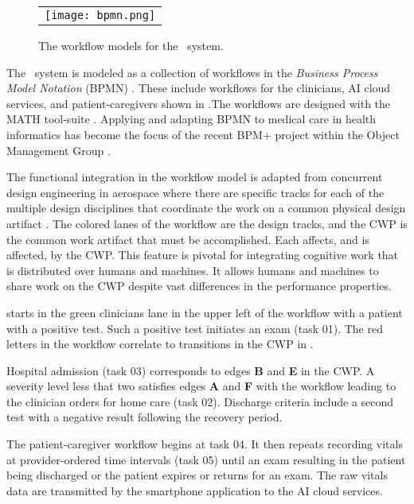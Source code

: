 \begin{figure*}[p]
  \begin{center}
    \begin{tabular}{c}
      \texttt{[image: bpmn.png]}
    \end{tabular}
  \end{center}
\caption{The workflow models for the \phware\ system.}
\label{fig:bpmn}
\end{figure*}

The \phware\ system is modeled as a collection of workflows in the \emph{Business Process Model Notation} (BPMN) \cite{BPMNSpecification}. These include workflows for the clinicians, AI cloud services, and patient-caregivers shown in .The workflows are designed with the MATH tool-suite \cite{workflowmodel}. Applying and adapting BPMN to medical care in health informatics has become the focus of the recent BPM+ project within the Object Management Group \cite{bpm}. 

The functional integration in the workflow model is adapted from concurrent design engineering in aerospace where there are specific tracks for each of the multiple design disciplines that coordinate the work on a common physical design artifact \cite{10.1007/978-1-4471-1538-0_9}. The colored lanes of the workflow are the design tracks, and the CWP is the common work artifact that must be accomplished. Each affects, and is affected, by the CWP. This feature is pivotal for integrating cognitive work that is distributed over humans and machines. It allows humans and machines to share work on the CWP despite vast differences in the performance properties. 

 starts in the green clinicians lane in the upper left of the workflow with a patient with a positive test. Such a positive test initiates an exam (task 01). The red letters in the workflow correlate to transitions in the CWP in . 

Hospital admission (task 03) corresponds to edges \textbf{B} and \textbf{E} in the CWP. A severity level less that two satisfies edges \textbf{A} and \textbf{F} with the workflow leading to the clinician orders for home care (task 02). Discharge criteria include a second test with a negative result following the recovery period.

The patient-caregiver workflow begins at task 04. It then repeats recording vitals at provider-ordered time intervals (task 05) until an exam resulting in the patient being discharged or the patient expires or returns for an exam. The raw vitals data are transmitted by the smartphone application to the AI cloud services. 

